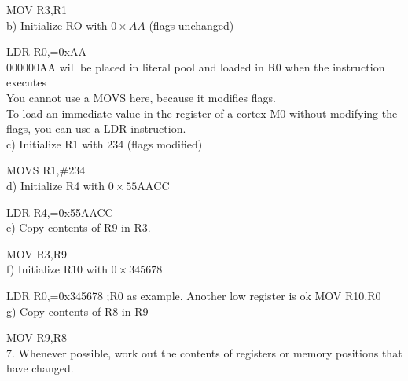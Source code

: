 \documentclass[10pt]{article}
\begin{document}
MOV R3,R1\\
b) Initialize RO with $0 \times A A$ (flags unchanged)

LDR R0,=0xAA\\
000000AA will be placed in literal pool and loaded in R0 when the instruction executes\\
You cannot use a MOVS here, because it modifies flags.\\
To load an immediate value in the register of a cortex M0 without modifying the flags, you can use a LDR instruction.\\
c) Initialize R1 with 234 (flags modified)

MOVS R1,\#234\\
d) Initialize R4 with $0 \times 55 \mathrm{AACC}$

LDR R4,=0x55AACC\\
e) Copy contents of R9 in R3.

MOV R3,R9\\
f) Initialize R10 with $0 \times 345678$

LDR R0,=0x345678 ;R0 as example. Another low register is ok MOV R10,R0\\
g) Copy contents of R8 in R9

MOV R9,R8\\
7. Whenever possible, work out the contents of registers or memory positions that have changed.
\end{document}
